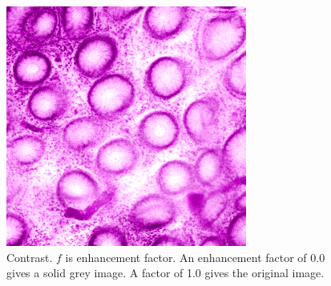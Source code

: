 \begin{figure}[H]
\begin{minipage}{0.25\columnwidth}
	\end{minipage}
	\begin{minipage}{0.25\columnwidth}
		\centering
		\includegraphics[clip, width=\linewidth]{fig/preprocessing/data_aug/color/CONTRAST/CONTRAST_1_50}
	\end{minipage}	
	
	\caption{Contrast. $f$ is enhancement factor. An enhancement factor of 0.0 gives a solid grey image. A factor of 1.0 gives the original image.}
	\label{fig:}

\end{figure}

